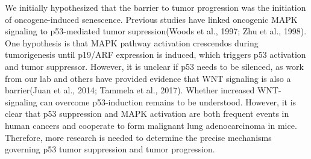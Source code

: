 We initially hypothesized that the barrier to tumor progression was the initiation of oncogene-induced senescence. Previous studies have linked oncogenic MAPK signaling to p53-mediated tumor supression(Woods et al., 1997; Zhu et al., 1998). One hypothesis is that MAPK pathway activation crescendos during tumorigenesis until p19/ARF expression is induced, which triggers p53 activation and tumor suppressor. However, it is unclear if p53 needs to be silenced, as work from our lab and others have provided evidence that WNT signaling is also a barrier(Juan et al., 2014; Tammela et al., 2017). Whether increased WNT-signaling can overcome p53-induction remains to be understood. However, it is clear that p53 suppression and MAPK activation are both frequent events in human cancers and cooperate to form malignant lung adenocarcinoma in mice. Therefore, more research is needed to determine the precise mechanisms governing p53 tumor suppression and tumor progression.

